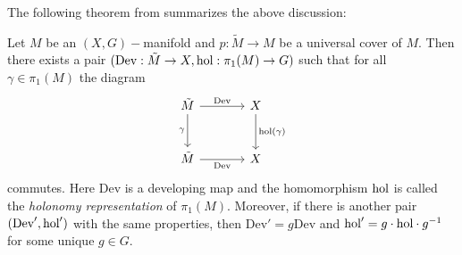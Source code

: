 The following theorem from \cite{goldman} summarizes the above discussion:
\begin{theorem}
  Let $M$ be an $(X,G)-$manifold and $p:\tilde{M}\to M$ be a universal cover of $M$. Then there exists a pair $(\text{Dev}:\tilde{M}\to X,\text{hol}:\pi_1(M)\to G)$ such that for all $\gamma\in \pi_1(M)$ the diagram
  \[\begin{tikzcd}[sep=large]
	{\tilde{M}} & X \\
	{\tilde{M}} & X
	\arrow["{\text{Dev}}", from=1-1, to=1-2]
	\arrow["\gamma"', from=1-1, to=2-1]
	\arrow["{\text{hol}(\gamma)}", from=1-2, to=2-2]
	\arrow["{\text{Dev}}"', from=2-1, to=2-2]
\end{tikzcd}\]
commutes. Here $\text{Dev}$ is a developing map and the homomorphism $\text{hol}$ is called the \textit{holonomy representation} of $\pi_1(M)$. Moreover, if there is another pair $(\text{Dev}',\text{hol}')$ with the same properties, then $\text{Dev}' = g\text{Dev}$ and $\text{hol}' = g\cdot \text{hol} \cdot g^{-1}$ for some unique $g\in G$.
\end{theorem}

